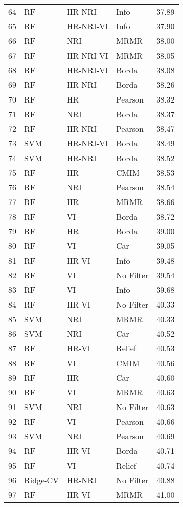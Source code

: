 \begin{table}[ht]
\begin{tabular}{rlllr}
  64 & RF & HR-NRI & Info & 37.89 \\ 
  65 & RF & HR-NRI-VI & Info & 37.90 \\ 
  66 & RF & NRI & MRMR & 38.00 \\ 
  67 & RF & HR-NRI-VI & MRMR & 38.05 \\ 
  68 & RF & HR-NRI-VI & Borda & 38.08 \\ 
  69 & RF & HR-NRI & Borda & 38.26 \\ 
  70 & RF & HR & Pearson & 38.32 \\ 
  71 & RF & NRI & Borda & 38.37 \\ 
  72 & RF & HR-NRI & Pearson & 38.47 \\ 
  73 & SVM & HR-NRI-VI & Borda & 38.49 \\ 
  74 & SVM & HR-NRI & Borda & 38.52 \\ 
  75 & RF & HR & CMIM & 38.53 \\ 
  76 & RF & NRI & Pearson & 38.54 \\ 
  77 & RF & HR & MRMR & 38.66 \\ 
  78 & RF & VI & Borda & 38.72 \\ 
  79 & RF & HR & Borda & 39.00 \\ 
  80 & RF & VI & Car & 39.05 \\ 
  81 & RF & HR-VI & Info & 39.48 \\ 
  82 & RF & VI & No Filter & 39.54 \\ 
  83 & RF & VI & Info & 39.68 \\ 
  84 & RF & HR-VI & No Filter & 40.33 \\ 
  85 & SVM & NRI & MRMR & 40.33 \\ 
  86 & SVM & NRI & Car & 40.52 \\ 
  87 & RF & HR-VI & Relief & 40.53 \\ 
  88 & RF & VI & CMIM & 40.56 \\ 
  89 & RF & HR & Car & 40.60 \\ 
  90 & RF & VI & MRMR & 40.63 \\ 
  91 & SVM & NRI & No Filter & 40.63 \\ 
  92 & RF & VI & Pearson & 40.66 \\ 
  93 & SVM & NRI & Pearson & 40.69 \\ 
  94 & RF & HR-VI & Borda & 40.71 \\ 
  95 & RF & VI & Relief & 40.74 \\ 
  96 & Ridge-CV & HR-NRI & No Filter & 40.88 \\ 
  97 & RF & HR-VI & MRMR & 41.00 \\ 

\end{tabular}
\end{table}
